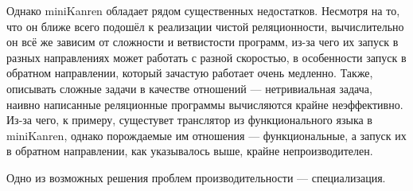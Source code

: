 
Однако miniKanren обладает рядом существенных недостатков. Несмотря на то,
что он ближе всего подошёл к реализации чистой реляционности, вычислительно
он всё же зависим от сложности и ветвистости программ, из-за чего их запуск в
разных направлениях может работать с разной скоростью, в особенности запуск в обратном направлении,
который зачастую работает очень медленно.
Также, описывать сложные задачи в качестве отношений --- нетривиальная задача,
наивно написанные реляционные программы вычисляются крайне неэффективно.
Из-за чего, к примеру, сущестувет транслятор из функционального языка в
miniKanren\cite{trconv}, однако порождаемые им отношения --- функциональные,
а запуск их в обратном направлении, как указывалось выше, крайне
непроизводителен\cite{lozov}.

Одно из возможных решения проблем производительности --- специализация.
